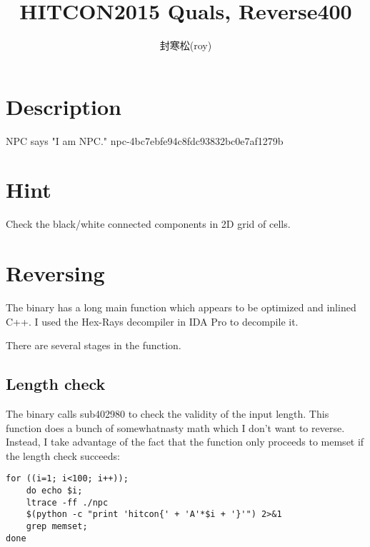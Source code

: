 \documentclass[a4paper,UTF8]{ctexart}
\title{HITCON2015 Quals, Reverse400}
\author{封寒松(roy)}
\affil{哈尔滨工业大学，计算机科学与技术学院，royfhs@163.com}
\date{}
\begin{document}
\maketitle


\section{Description}

\begin{quizdesc}[label=Reverse400 NPC]
NPC says "I am NPC."
npc-4bc7ebfe94c8fdc93832bc0e7af1279b
\end{quizdesc}
  
\section{Hint}

Check the black/white connected components in 2D grid of cells.

\section{Reversing}

The binary has a long main function which appears to be optimized and inlined C++. I used the Hex-Rays decompiler in IDA Pro to decompile it.

    There are several stages in the function.
    
  \subsection{Length check}
  
  The binary calls sub402980 to check the validity of the input length. This function does a bunch of somewhatnasty math which I don't want to reverse. Instead, I take advantage of the fact that the function only proceeds to memset if the length check succeeds:

\begin{verbatim}
for ((i=1; i<100; i++));
	do echo $i;
	ltrace -ff ./npc
	$(python -c "print 'hitcon{' + 'A'*$i + '}'") 2>&1
	grep memset;
done
\end{verbatim}
      
\end{document}
